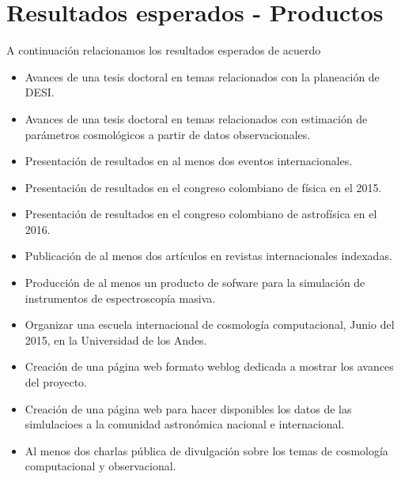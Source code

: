 
\section{Resultados esperados - Productos}


A continuaci\'on relacionamos los resultados esperados de acuerdo  

\begin{itemize}
\item Avances de una tesis doctoral en temas relacionados con la planeaci\'on de DESI.

\item Avances de una tesis doctoral en temas relacionados con estimaci\'on de par\'ametros cosmol\'ogicos a partir de datos observacionales.

\item Presentaci\'on de resultados en al menos dos eventos internacionales. 

\item Presentaci\'on de resultados en el congreso colombiano de f\'isica en el 2015.  

\item Presentaci\'on de resultados en el congreso colombiano de astrof\'isica en el 2016. 

\item Publicaci\'on de al menos dos art\'iculos en revistas internacionales indexadas.

\item Producci\'on de al menos un producto de sofware para la simulaci\'on de instrumentos de espectroscop\'ia masiva. 

\item Organizar una escuela internacional de cosmolog\'ia computacional, Junio del 2015, en la Universidad de los Andes. 

\item Creaci\'on de una p\'agina web formato weblog dedicada a mostrar los avances del proyecto.

\item Creaci\'on de una p\'agina web para hacer disponibles los datos de las simlulacioes a la comunidad astron\'omica nacional e internacional.

\item Al menos dos charlas p\'ublica de divulgaci\'on sobre los temas de cosmolog\'ia computacional y observacional.



\end{itemize}
